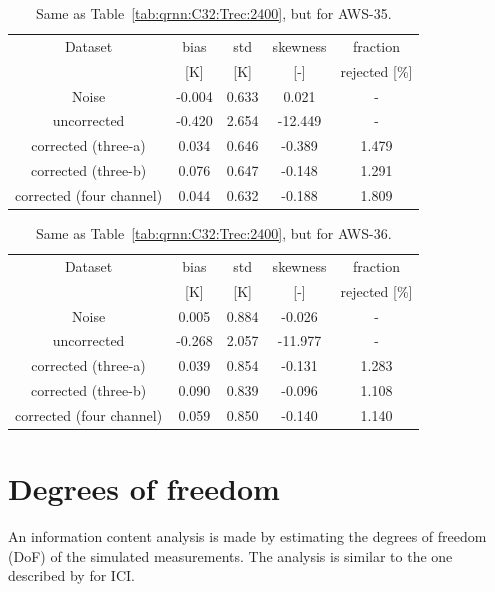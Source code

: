 \documentclass[12pt]{article}
\begin{document}
\begin{table}[!p]
	\centering
	\begin{tabular}[b]{c|c|c|c|c}
		Dataset  		  &   bias &   std &   skewness & fraction  \\
		&   [K]  &   [K] & [-] & rejected [\%]\\
		\hline
Noise                      & -0.004 & 0.633 &              0.021 &      - \\
uncorrected                & -0.420 & 2.654 &            -12.449 &      - \\
corrected (three-a) 	   &  0.034 & 0.646 &             -0.389 &      1.479 \\
corrected (three-b) 	   &  0.076 & 0.647 &             -0.148 &      1.291 \\
corrected (four channel)   &  0.044 & 0.632 &             -0.188 &      1.809 \\
		\hline
	\end{tabular}
	\caption{ Same as Table~\ref{tab:qrnn:C32:Trec:2400}, but for AWS-35. }
	\label{tab:qrnn:C35:Trec:2400}
\end{table}

\begin{table}[!p]
	\centering
	\begin{tabular}[b]{c|c|c|c|c}
		Dataset  		  &   bias &   std &   skewness & fraction  \\
		&   [K]  &   [K] & [-] & rejected [\%]\\
		\hline
Noise                      &  0.005 & 0.884 &             -0.026 &      - \\
uncorrected                & -0.268 & 2.057 &            -11.977 &      - \\
corrected (three-a) &  0.039 & 0.854 &             -0.131 &      1.283 \\
corrected (three-b) &  0.090 & 0.839 &             -0.096 &      1.108 \\
corrected (four channel)   &  0.059 & 0.850 &             -0.140 &      1.140 \\
		\hline
	\end{tabular}
	\caption{ Same as Table~\ref{tab:qrnn:C32:Trec:2400}, but for AWS-36.  }
	\label{tab:qrnn:C36:Trec:2400}
\end{table}

\section{Degrees of freedom}
%
An information content analysis is made by estimating the degrees of freedom
(DoF) of the simulated measurements. The analysis is similar to the one
described by \citet{eriksson:towar:20} for ICI.
\end{document}
